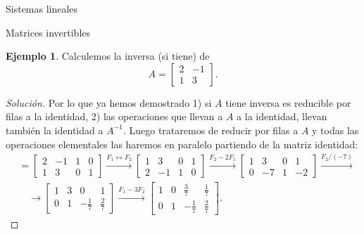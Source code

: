 \documentclass[a4paper,12pt,twoside,spanish,reqno]{amsbook}
\theoremstyle{definition}
\newtheorem{ejemplo}{Ejemplo}[section]
\theoremstyle{remark}
\newcommand{\Id}{\operatorname{Id}}
\begin{document}
\begin{chapter}{Sistemas lineales}
\begin{section}{Matrices invertibles}
            \begin{ejemplo}
                Calculemos la inversa (si tiene) de 
                \begin{equation*}
                A=\begin{bmatrix}2&-1\\1&3 \end{bmatrix}.
                \end{equation*}
            \end{ejemplo}
            \begin{proof}[Solución] Por lo que ya hemos demostrado 1) si $A$ tiene inversa es reducible por filas a la identidad, 2) las operaciones que llevan a $A$ a la identidad, llevan también la identidad  a $A^{-1}$. Luego  trataremos de reducir por filas a $A$ y todas las operaciones elementales las haremos en paralelo partiendo de la matriz identidad:
                \begin{align*}
                [A|\Id] &= \left[\begin{array}{cc|cc}2&-1 &  1&0\\1&3& 0&1\end{array}\right] 
                \stackrel{F_1\leftrightarrow F_2}{\longrightarrow} 
                \left[\begin{array}{cc|cc}1&3& 0&1\\2&-1 &  1&0 \end{array}\right]
                \stackrel{F_2-2 F_1}{\longrightarrow}
                \left[\begin{array}{cc|cc}1&3& 0&1\\0&-7 &  1&-2 \end{array}\right]
                \stackrel{F_2/(-7)}{\longrightarrow}\\
                &\quad\longrightarrow 
                \left[\begin{array}{cc|cc}1&3& 0&1\\0&1 &  -\frac17&\frac27\end{array}\right]
                \stackrel{F_1-3 F_2}{\longrightarrow}
                \left[\begin{array}{cc|cc}1&0&  \frac37&\frac17\\0&1 &  -\frac17&\frac27 \end{array}\right].

\end{align*}
\end{proof}
\end{section}
\end{chapter}
\end{document}
